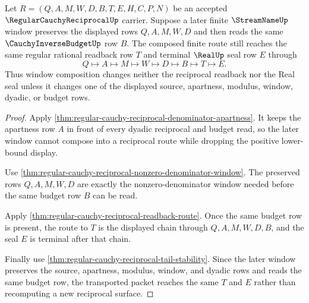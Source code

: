 \begin{theorem}
\label{thm:regular-cauchy-reciprocal-window-composition}
Let $R=(Q,A,M,W,D,B,T,E,H,C,P,N)$ be an accepted $\RegularCauchyReciprocalUp$ carrier. Suppose a later finite $\StreamNameUp$ window preserves the displayed rows $Q,A,M,W,D$ and then reads the same $\CauchyInverseBudgetUp$ row $B$. The composed finite route still reaches the same regular rational readback row $T$ and terminal $\RealUp$ seal row $E$ through
$$
Q\longmapsto A\longmapsto M\longmapsto W\longmapsto D\longmapsto B\longmapsto T\longmapsto E.
$$
Thus window composition changes neither the reciprocal readback nor the Real seal unless it changes one of the displayed source, apartness, modulus, window, dyadic, or budget rows.
\end{theorem}
\begin{proof}
Apply \autoref{thm:regular-cauchy-reciprocal-denominator-apartness}. It keeps the apartness row $A$ in front of every dyadic reciprocal and budget read, so the later window cannot compose into a reciprocal route while dropping the positive lower-bound display.

Use \autoref{thm:regular-cauchy-reciprocal-nonzero-denominator-window}. The preserved rows $Q,A,M,W,D$ are exactly the nonzero-denominator window needed before the same budget row $B$ can be read.

Apply \autoref{thm:regular-cauchy-reciprocal-readback-route}. Once the same budget row is present, the route to $T$ is the displayed chain through $Q,A,M,W,D,B$, and the seal $E$ is terminal after that chain.

Finally use \autoref{thm:regular-cauchy-reciprocal-tail-stability}. Since the later window preserves the source, apartness, modulus, window, and dyadic rows and reads the same budget row, the transported packet reaches the same $T$ and $E$ rather than recomputing a new reciprocal surface.
\end{proof}

